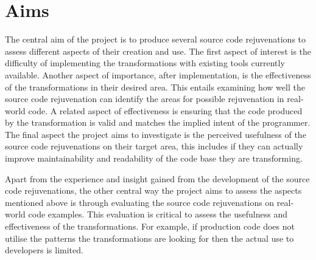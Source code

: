 \documentclass[bsc,frontabs,singlespacing,twoside,parskip,deptreport]{infthesis}
\begin{document}
\section{Aims} %
The central aim of the project is to produce several source code rejuvenations to assess different aspects of their creation and use. The first aspect of interest is the difficulty of implementing the transformations with existing tools currently available. Another aspect of importance, after implementation, is the effectiveness of the transformations in their desired area. This entails examining how well the source code rejuvenation can identify the areas for possible rejuvenation in real-world code. A related aspect of effectiveness is ensuring that the code produced by the transformation is valid and matches the implied intent of the programmer. The final aspect the project aims to investigate is the perceived usefulness of the source code rejuvenations on their target area, this includes if they can actually improve maintainability and readability of the code base they are transforming.

Apart from the experience and insight gained from the development of the source code rejuvenations, the other central way the project aims to assess the aspects mentioned above is through evaluating the source code rejuvenations on real-world code examples. This evaluation is critical to assess the usefulness and effectiveness of the transformations. For example, if production code does not utilise the patterns the transformations are looking for then the actual use to developers is limited.


    
\end{document}
